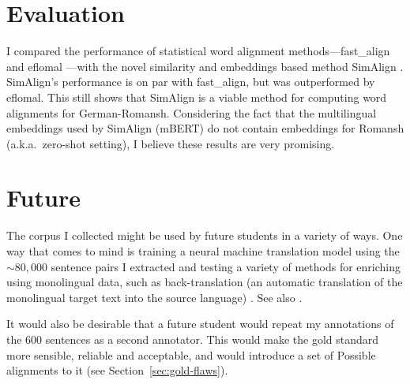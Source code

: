 \section{Evaluation}
I compared the performance of statistical word alignment methods---fast\_align \autocite{dyer-etal-2013-simple} and eflomal \autocite{Ostling2016efmaral}---with the novel similarity and embeddings based method SimAlign \autocite{jalili-sabet-etal-2020-simalign}. 
SimAlign's performance is on par with fast\_align, but was outperformed by eflomal. 
This still shows that SimAlign is a viable method for computing word alignments for German-Romansh. 
Considering the fact that the multilingual embeddings used by SimAlign (mBERT) do not contain embeddings for Romansh (a.k.a.~zero-shot setting), I believe these results are very promising.

\section{Future}
The corpus I collected might be used by future students in a variety of ways. 
One way that comes to mind is training a neural machine translation model using the $\sim80,000$ sentence pairs I extracted and testing a variety of methods for enriching using monolingual data, such as back-translation (an automatic translation of the monolingual target text into the source language) \autocite{sennrich-etal-2016-improving}. 
See also \cite{https://doi.org/10.48550/arxiv.2107.04239}.

It would also be desirable that a future student would repeat my annotations of the 600 sentences as a second annotator. 
This would make the gold standard more sensible, reliable and acceptable, and would introduce a set of Possible alignments to it (see Section~\ref{sec:gold-flaws}).




